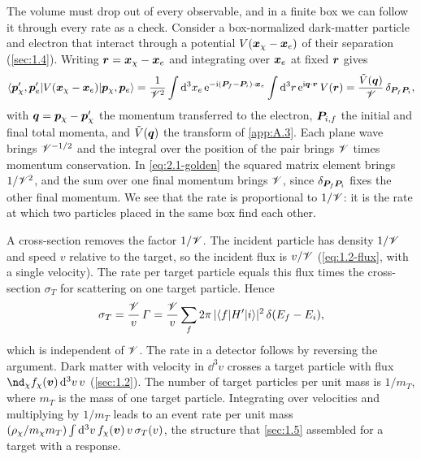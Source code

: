 The volume must drop out of every observable, and in a finite box we can follow it through every rate as a check. Consider a box-normalized dark-matter particle and electron that interact through a potential $V(\bm{x}_\chi - \bm{x}_e)$ of their separation (\cref{sec:1.4}). Writing $\bm{r} = \bm{x}_\chi - \bm{x}_e$ and integrating over $\bm{x}_e$ at fixed $\bm{r}$ gives
\begin{equation}
  \langle\bm{p}_\chi',\bm{p}_e'|V(\bm{x}_\chi - \bm{x}_e)|\bm{p}_\chi,\bm{p}_e\rangle
  = \frac{1}{\mathscr{V}^2}\int\mathrm{d}^3x_e\,\mathrm{e}^{-\mathrm{i}(\bm{P}_f - \bm{P}_i)\cdot\bm{x}_e}\int\mathrm{d}^3r\,\mathrm{e}^{\mathrm{i}\bm{q}\cdot\bm{r}}\,V(\bm{r})
  = \frac{\tilde V(\bm{q})}{\mathscr{V}}\,\delta_{\bm{P}_f\bm{P}_i} ,
  \label{eq:2.1-Vbox}
\end{equation}
with $\bm{q} = \bm{p}_\chi - \bm{p}_\chi'$ the momentum transferred to the electron, $\bm{P}_{i,f}$ the initial and final total momenta, and $\tilde V(\bm{q})$ the transform of \cref{app:A.3}. Each plane wave brings $\mathscr{V}^{-1/2}$ and the integral over the position of the pair brings $\mathscr{V}$ times momentum conservation. In \cref{eq:2.1-golden} the squared matrix element brings $1/\mathscr{V}^2$, and the sum over one final momentum brings $\mathscr{V}$, since $\delta_{\bm{P}_f\bm{P}_i}$ fixes the other final momentum. We see that the rate is proportional to $1/\mathscr{V}$: it is the rate at which two particles placed in the same box find each other.

A cross-section removes the factor $1/\mathscr{V}$. The incident particle has density $1/\mathscr{V}$ and speed $v$ relative to the target, so the incident flux is $v/\mathscr{V}$ (\cref{eq:1.2-flux}, with a single velocity). The rate per target particle equals this flux times the cross-section $\sigma_T$ for scattering on one target particle. Hence
\begin{equation}
  \sigma_T = \frac{\mathscr{V}}{v}\,\varGamma = \frac{\mathscr{V}}{v}\sum_f 2\pi\,|\langle f|H'|i\rangle|^2\,\delta(E_f - E_i),
  \label{eq:2.1-sigma}
\end{equation}
which is independent of $\mathscr{V}$. The rate in a detector follows by reversing the argument. Dark matter with velocity in $\dd^3v$ crosses a target particle with flux $\nd_\chi f_\chi(\vect{v})\,\dd^3v\,v$ (\cref{sec:1.2}). The number of target particles per unit mass is $1/m_T$, where $m_T$ is the mass of one target particle. Integrating over velocities and multiplying by $1/m_T$ leads to an event rate per unit mass $(\rho_\chi/m_\chi m_T)\int\mathrm{d}^3v\,f_\chi(\bm{v})\,v\,\sigma_T(v)$, the structure that \cref{sec:1.5} assembled for a target with a response.

